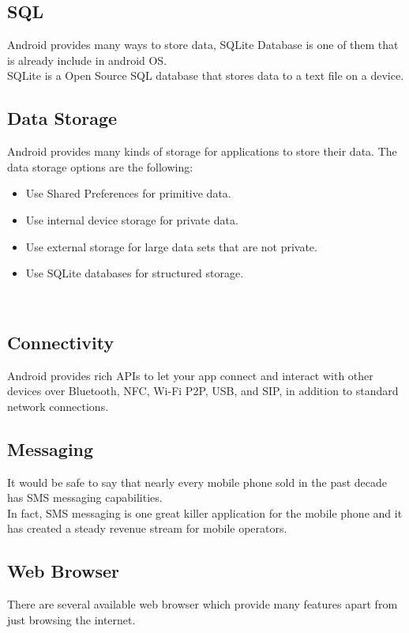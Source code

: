 \documentclass[twoside,a4paper,16pt]{book}
\begin{document}
\subsection{SQL}
Android provides many ways to store data, SQLite Database is one of them that is already include in android OS.\\ SQLite is a Open Source SQL database that stores data to a text file on a device.\\

\subsection{Data Storage}
Android provides many kinds of storage for applications to store their data. The  data storage options are the following:
\begin{itemize} 
\item Use Shared Preferences for primitive data.
\item Use internal device storage for private data.
\item Use external storage for large data sets that are not private.
\item Use SQLite databases for structured storage.
\end{itemize}\\


\subsection{Connectivity}
Android provides rich APIs to let your app connect and interact with other devices over Bluetooth, NFC, Wi-Fi P2P, USB, and SIP, in addition to standard network connections.\\

\subsection{Messaging}
It would be safe to say that nearly every mobile phone sold in the past decade has SMS messaging capabilities.\\ In fact, SMS messaging is one great killer application for the mobile phone and it has created a steady revenue stream for mobile operators.\\

\subsection{Web Browser}
There are several available web browser which provide many features apart from just browsing the internet.\\
\end{document}
